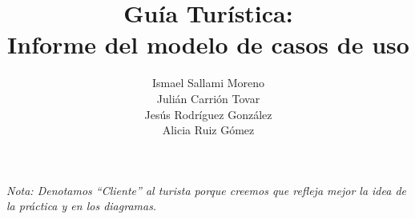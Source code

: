\documentclass[twoside,openright,titlepage,numbers=noenddot,headinclude,footinclude=true,
cleardoublepage=empty,abstractoff,BCOR=5mm,paper=a4,fontsize=12pt,main=spanish,pdfstartpage=1]{scrreprt}
\author{Ismael Sallami Moreno \\ Julián Carrión Tovar \\ Jesús Rodríguez González \\ Alicia Ruiz Gómez}
\title{Guía Turística: \\ Informe del modelo de casos de uso}
\theoremstyle{plain}
\begin{document}
\maketitle


\onehalfspacing

\tableofcontents
\textit{Nota: Denotamos ``Cliente'' al turista porque creemos que refleja mejor la idea de la práctica y en los diagramas.}










%

\end{document}
